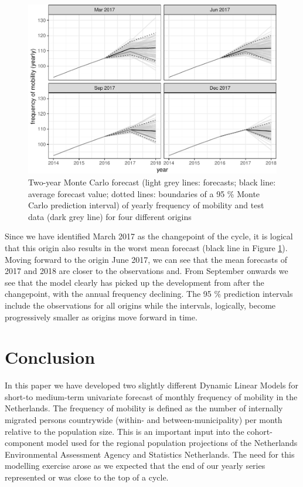 \documentclass[12pt, a4paper]{article}
\begin{document}
\begin{figure}[H]
  \caption{\label{fig:forecast-mc}Two-year Monte Carlo forecast (light grey lines: forecasts; black line: average forecast value; dotted lines: boundaries of a 95 \% Monte Carlo prediction interval) of yearly frequency of mobility and test data (dark grey line) for four different origins}
\centering
\includegraphics[scale = 0.8]{../figs/freq--mc-intervals-1.pdf}
\end{figure}

Since we have identified March 2017 as the changepoint of the cycle, it is logical that this origin also results in the worst mean forecast (black line in Figure \ref{fig:forecast-mc}).  Moving forward to the origin June 2017, we can see that the mean forecasts of 2017 and 2018 are closer to the observations and. From September onwards we see that the model clearly has picked up the development from after the changepoint, with the annual frequency declining. The 95 \% prediction intervals include the observations for all origins while the intervals, logically, become progressively smaller as origins move forward in time.

\section{Conclusion}\label{conclusion}

In this paper we have developed two slightly different Dynamic Linear Models for short-to medium-term univariate forecast of monthly frequency of mobility in the
Netherlands. The frequency of mobility is defined as the number of
internally migrated persons countrywide (within- and
between-municipality) per month relative to the population size. This is an
important input into the cohort-component model used for the regional
population projections of the Netherlands Environmental Assessment Agency and Statistics Netherlands. The need for this modelling exercise arose as we expected that the end of our yearly series represented or was close to the top of a
cycle.
\end{document}
